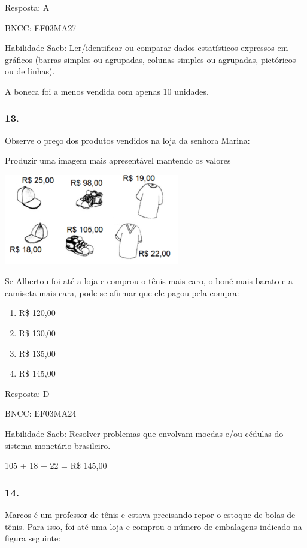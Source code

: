 Resposta: A

BNCC: EF03MA27

Habilidade Saeb: Ler/identificar ou comparar dados estatísticos
expressos em gráficos (barras simples ou agrupadas, colunas simples ou
agrupadas, pictóricos ou de linhas).

A boneca foi a menos vendida com apenas 10 unidades.

\subsubsection{13.}\label{section-179}

Observe o preço dos produtos vendidos na loja da senhora Marina:

Produzir uma imagem mais apresentável mantendo os valores

\includegraphics[width=3.02451in,height=1.54853in]{media/image138.png}

Se Albertou foi até a loja e comprou o tênis mais caro, o boné mais
barato e a camiseta mais cara, pode-se afirmar que ele pagou pela
compra:

\begin{enumerate}
\def\labelenumi{\alph{enumi})}
\item
  R\$ 120,00
\item
  R\$ 130,00
\item
  R\$ 135,00
\item
  R\$ 145,00
\end{enumerate}

Resposta: D

BNCC: EF03MA24

Habilidade Saeb: Resolver problemas que envolvam moedas e/ou cédulas do
sistema monetário brasileiro.

105 + 18 + 22 = R\$ 145,00

\subsubsection{14. }\label{section-180}

Marcos é um professor de tênis e estava precisando repor o estoque de
bolas de tênis. Para isso, foi até uma loja e comprou o número de
embalagens indicado na figura seguinte:

